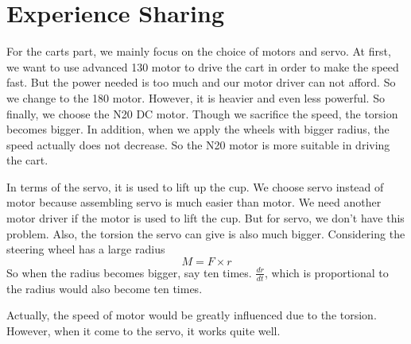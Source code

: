 \section{Experience Sharing}

For the carts part, we mainly focus on the choice of motors and servo. At first, we want to use advanced 130 motor to drive the cart in order to make the speed fast. But the power needed is too much and our motor driver can not afford. So we change to the 180 motor. However, it is heavier and even less powerful. So finally, we choose the N20 DC motor. Though we sacrifice the speed, the torsion becomes bigger. In addition, when we apply the wheels with bigger radius, the speed actually does not decrease. So the N20 motor is more suitable in driving the cart. 
\par
In terms of the servo, it is used to lift up the cup. We choose servo instead of motor because assembling servo is much easier than motor. We need another motor driver if the motor is used to lift the cup. But for servo, we don’t have this problem. Also, the torsion the servo can give is also much bigger. Considering the steering wheel has a large radius
$$M=F\times r$$
So when the radius becomes bigger, say ten times. $\frac{dr}{dt}$, which is proportional to the radius would also become ten times. 
\par
Actually, the speed of motor would be greatly influenced due to the torsion. However, when it come to the servo, it works quite well.